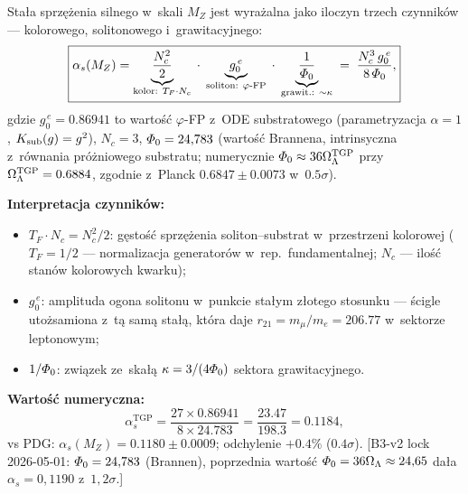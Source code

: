 \begin{proposition}%
\label{prop:alphas-phiFP}
Sta\l{}a sprz\k{e}\.zenia silnego w~skali $M_Z$ jest wyra\.zalna
jako iloczyn trzech czynnik\'ow --- kolorowego, solitonowego
i~grawitacyjnego:
\begin{equation}\label{eq:alphas-formula}
  \boxed{\alpha_s(M_Z)
    = \underbrace{\frac{N_c^2}{2}}_{\text{kolor: } T_F \cdot N_c}
    \;\cdot\;
    \underbrace{g_0^{\,e}}_{\text{soliton: }\varphi\text{-FP}}
    \;\cdot\;
    \underbrace{\frac{1}{\varPhi_0}}_{\text{grawit.: }\sim\kappa}
    \;=\; \frac{N_c^3\,g_0^{\,e}}{8\,\varPhi_0},}
\end{equation}
gdzie $g_0^{\,e} = 0.86941$ to warto\'s\'c $\varphi$-FP
z~ODE substratowego (parametryzacja $\alpha = 1$,
$K_{\rm sub}(g) = g^2$), $N_c = 3$, $\varPhi_0 = 24{,}783$
(warto\'s\'c Brannena, intrinsyczna z~r\'ownania pr\'o\.zniowego
substratu; numerycznie $\varPhi_0 \approx 36\Omega_\Lambda^{\rm TGP}$
przy $\Omega_\Lambda^{\rm TGP} = 0.6884$,
zgodnie z~Planck $0.6847 \pm 0.0073$ w~$0.5\sigma$).

\textbf{Interpretacja czynnik\'ow:}
\begin{itemize}[nosep]
  \item $T_F \cdot N_c = N_c^2/2$: g\k{e}sto\'s\'c sprz\k{e}\.zenia
    soliton--substrat w~przestrzeni kolorowej
    ($T_F = 1/2$ --- normalizacja generator\'ow w~rep.\ fundamentalnej;
    $N_c$ --- ilo\'s\'c stan\'ow kolorowych kwarku);
  \item $g_0^{\,e}$: amplituda ogona solitonu w~punkcie sta\l{}ym
    z\l{}otego stosunku --- \'scigle uto\.zsamiona z~t\k{a} sam\k{a}
    sta\l{}\k{a}, kt\'ora daje $r_{21} = m_\mu/m_e = 206.77$
    w~sektorze leptonowym;
  \item $1/\varPhi_0$: zwi\k{a}zek ze~ska\l{}\k{a} $\kappa = 3/(4\varPhi_0)$
    sektora grawitacyjnego.
\end{itemize}

\textbf{Warto\'s\'c numeryczna:}
\begin{equation}
  \alpha_s^{\mathrm{TGP}} = \frac{27 \times 0.86941}{8 \times 24.783}
  = \frac{23.47}{198.3} = 0.1184,
\end{equation}
vs PDG: $\alpha_s(M_Z) = 0.1180 \pm 0.0009$;
odchylenie $+0.4\%$ ($0.4\sigma$).
\textsf{[B3-v2 lock 2026-05-01: $\varPhi_0 = 24{,}783$ (Brannen),
poprzednia warto\'s\'c $\varPhi_0 = 36\Omega_\Lambda \approx 24{,}65$
da\l{}a $\alpha_s = 0{,}1190$ z~$1{,}2\sigma$.]}


\end{proposition}
